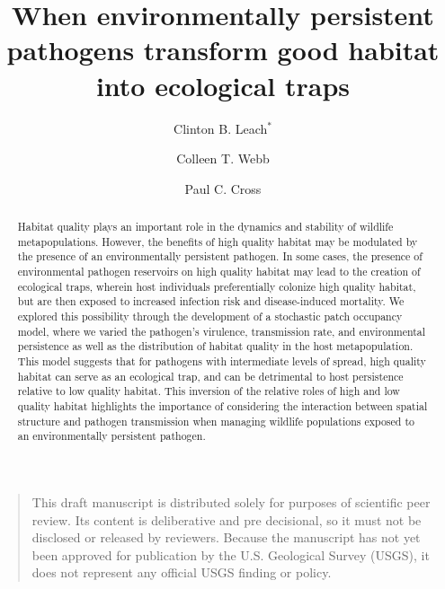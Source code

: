 \documentclass{article}
\begin{document}
\title{When environmentally persistent pathogens transform good habitat into ecological traps}

\author[1]{Clinton B. Leach$^*$}
\author[1]{Colleen T. Webb}
\author[2]{Paul C. Cross}


\maketitle


\begin{quote}
This draft manuscript is distributed solely for purposes of scientific peer review.  Its content is deliberative and pre decisional, so it must not be disclosed or released by reviewers.  Because the manuscript has not yet been approved for publication by the U.S. Geological Survey (USGS), it does not represent any official USGS finding or policy.
\end{quote}

\newpage

\begin{abstract} 
Habitat quality plays an important role in the dynamics and stability of wildlife metapopulations.
However, the benefits of high quality habitat may be modulated by the presence of an environmentally persistent pathogen. In some cases, the presence of environmental pathogen reservoirs on high quality habitat may lead to the creation of ecological traps, wherein host individuals preferentially colonize high quality habitat, but are then exposed to increased infection risk and disease-induced mortality.  We explored this possibility through the development of a stochastic patch occupancy model, where we varied the pathogen's virulence, transmission rate, and environmental persistence as well as the distribution of habitat quality in the host metapopulation.  This model suggests that for pathogens with intermediate levels of spread, high quality habitat can serve as an ecological trap, and can be detrimental to host persistence relative to low quality habitat.  This inversion of the relative roles of high and low quality habitat highlights the importance of considering the interaction between spatial structure and pathogen transmission when managing wildlife populations exposed to an environmentally persistent pathogen.
\end{abstract}
\end{document}

